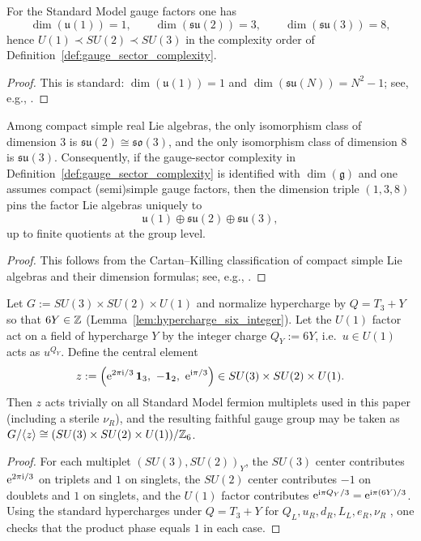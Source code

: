 \begin{lemma}\label{lem:gauge_dim_order}
For the Standard Model gauge factors one has
\[
\dim(\mathfrak{u}(1))=1,\qquad \dim(\mathfrak{su}(2))=3,\qquad \dim(\mathfrak{su}(3))=8,
\]
hence $U(1)\prec SU(2)\prec SU(3)$ in the complexity order of Definition~\ref{def:gauge_sector_complexity}.
\end{lemma}
\begin{proof}
This is standard: $\dim(\mathfrak{u}(1))=1$ and $\dim(\mathfrak{su}(N))=N^2-1$; see, e.g., \cite{PeskinSchroeder1995}.
\end{proof}

\begin{lemma}\label{lem:su2_su3_unique_by_dim}
Among compact simple real Lie algebras, the only isomorphism class of dimension $3$ is $\mathfrak{su}(2)\cong\mathfrak{so}(3)$, and the only isomorphism class of dimension $8$ is $\mathfrak{su}(3)$.
Consequently, if the gauge-sector complexity in Definition~\ref{def:gauge_sector_complexity} is identified with $\dim(\mathfrak{g})$ and one assumes compact (semi)simple gauge factors, then the dimension triple $(1,3,8)$ pins the factor Lie algebras uniquely to
\[
\mathfrak{u}(1)\oplus \mathfrak{su}(2)\oplus \mathfrak{su}(3),
\]
up to finite quotients at the group level.
\end{lemma}
\begin{proof}
This follows from the Cartan--Killing classification of compact simple Lie algebras and their dimension formulas; see, e.g., \cite{HallLieGroups2015,FultonHarris1991RepresentationTheory}.
\end{proof}

\begin{lemma}\label{lem:sm_global_gauge_group_z6}
Let $G:=SU(3)\times SU(2)\times U(1)$ and normalize hypercharge by $Q=T_3+Y$ so that $6Y\in\mathbb{Z}$ (Lemma~\ref{lem:hypercharge_six_integer}).
Let the $U(1)$ factor act on a field of hypercharge $Y$ by the integer charge $Q_Y:=6Y$, i.e.\ $u\in U(1)$ acts as $u^{Q_Y}$.
Define the central element
\[
z:=\left(\e^{2\pi\iu/3}\,\ind_3,\ -\ind_2,\ \e^{\iu\pi/3}\right)\in SU(3)\times SU(2)\times U(1).
\]
Then $z$ acts trivially on all Standard Model fermion multiplets used in this paper (including a sterile $\nu_R$), and the resulting faithful gauge group may be taken as $G/\langle z\rangle\cong (SU(3)\times SU(2)\times U(1))/\mathbb{Z}_6$.
\end{lemma}
\begin{proof}
For each multiplet $(SU(3),SU(2))_Y$, the $SU(3)$ center contributes $\mathrm{e}^{2\pi\mathrm{i}/3}$ on triplets and $1$ on singlets, the $SU(2)$ center contributes $-1$ on doublets and $1$ on singlets, and the $U(1)$ factor contributes $\mathrm{e}^{\mathrm{i}\pi Q_Y/3}=\mathrm{e}^{\mathrm{i}\pi(6Y)/3}$.
Using the standard hypercharges under $Q=T_3+Y$ for $Q_L,u_R,d_R,L_L,e_R,\nu_R$ \cite{PeskinSchroeder1995,PDGRPP2024}, one checks that the product phase equals $1$ in each case.
\end{proof}


